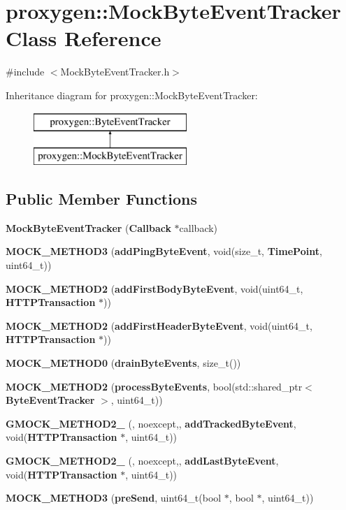 \section{proxygen\+:\+:Mock\+Byte\+Event\+Tracker Class Reference}
\label{classproxygen_1_1MockByteEventTracker}


{\ttfamily \#include $<$Mock\+Byte\+Event\+Tracker.\+h$>$}

Inheritance diagram for proxygen\+:\+:Mock\+Byte\+Event\+Tracker\+:\begin{figure}[H]
\begin{center}
\leavevmode
\includegraphics[height=2.000000cm]{classproxygen_1_1MockByteEventTracker}
\end{center}
\end{figure}
\subsection*{Public Member Functions}
\begin{DoxyCompactItemize}
\item 
{\bf Mock\+Byte\+Event\+Tracker} ({\bf Callback} $\ast$callback)
\item 
{\bf M\+O\+C\+K\+\_\+\+M\+E\+T\+H\+O\+D3} ({\bf add\+Ping\+Byte\+Event}, void(size\+\_\+t, {\bf Time\+Point}, uint64\+\_\+t))
\item 
{\bf M\+O\+C\+K\+\_\+\+M\+E\+T\+H\+O\+D2} ({\bf add\+First\+Body\+Byte\+Event}, void(uint64\+\_\+t, {\bf H\+T\+T\+P\+Transaction} $\ast$))
\item 
{\bf M\+O\+C\+K\+\_\+\+M\+E\+T\+H\+O\+D2} ({\bf add\+First\+Header\+Byte\+Event}, void(uint64\+\_\+t, {\bf H\+T\+T\+P\+Transaction} $\ast$))
\item 
{\bf M\+O\+C\+K\+\_\+\+M\+E\+T\+H\+O\+D0} ({\bf drain\+Byte\+Events}, size\+\_\+t())
\item 
{\bf M\+O\+C\+K\+\_\+\+M\+E\+T\+H\+O\+D2} ({\bf process\+Byte\+Events}, bool(std\+::shared\+\_\+ptr$<$ {\bf Byte\+Event\+Tracker} $>$, uint64\+\_\+t))
\item 
{\bf G\+M\+O\+C\+K\+\_\+\+M\+E\+T\+H\+O\+D2\+\_\+} (, noexcept,, {\bf add\+Tracked\+Byte\+Event}, void({\bf H\+T\+T\+P\+Transaction} $\ast$, uint64\+\_\+t))
\item 
{\bf G\+M\+O\+C\+K\+\_\+\+M\+E\+T\+H\+O\+D2\+\_\+} (, noexcept,, {\bf add\+Last\+Byte\+Event}, void({\bf H\+T\+T\+P\+Transaction} $\ast$, uint64\+\_\+t))
\item 
{\bf M\+O\+C\+K\+\_\+\+M\+E\+T\+H\+O\+D3} ({\bf pre\+Send}, uint64\+\_\+t(bool $\ast$, bool $\ast$, uint64\+\_\+t))
\end{DoxyCompactItemize}

